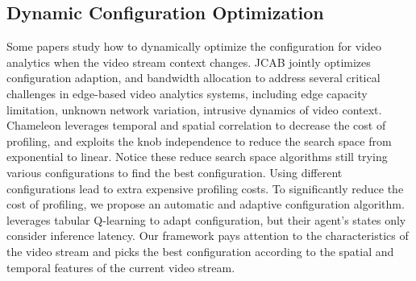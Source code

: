 \subsection{Dynamic Configuration Optimization}
Some papers study how to dynamically optimize the configuration for video analytics when the video stream context changes. JCAB \cite{wang2020jcab} jointly optimizes configuration adaption, and bandwidth allocation to address several critical challenges in edge-based video analytics systems, including edge capacity limitation, unknown network variation, intrusive dynamics of video context. Chameleon \cite{jiang2018chameleon} leverages temporal and spatial correlation to decrease the cost of profiling, and exploits the knob independence to reduce the search space from exponential to linear. Notice these reduce search space algorithms still trying various configurations to find the best configuration. Using different configurations lead to extra expensive profiling costs. To significantly reduce the cost of profiling, we propose an automatic and adaptive configuration algorithm. \cite{argerich2019orchestration} leverages tabular Q-learning to adapt configuration, but their agent's states only consider inference latency. Our framework pays attention to the characteristics of the video stream and picks the best configuration according to the spatial and temporal features of the current video stream.




